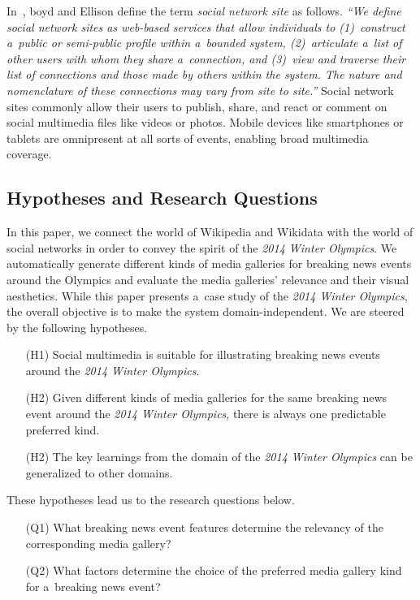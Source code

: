 \documentclass{sig-alternate}
\begin{document}
In~\cite{boyd2007socialnetworksites},
boyd and Ellison define the term
\emph{social network site} as follows.
\textit{``We define social network sites as web-based services
that allow individuals to
\emph{(1)}~construct a~public or
semi-public profile within a~bounded system,
\emph{(2)}~articulate a~list of other users
with whom they share a~connection, and
\emph{(3)}~view and traverse their list of connections
and those made by others within the system.
The nature and nomenclature of these connections
may vary from site to site.''}
Social network sites commonly allow their users
to publish, share, and react or comment on social multimedia files
like videos or photos.
Mobile devices like smartphones or tablets
are omnipresent at all sorts of events,
enabling broad multimedia coverage.

\subsection{Hypotheses and Research Questions}

In this paper, we connect the world of
Wikipedia and Wikidata with the world of social networks
in order to convey the spirit of the
\emph{2014 Winter Olympics}.
We automatically generate different kinds of media galleries
for breaking news events around the Olympics
and evaluate the media galleries' relevance
and their visual aesthetics.
While this paper presents a~case study
of the \emph{2014 Winter Olympics},
the overall objective is to make the system domain-inde\-pendent.
We are steered by the following hypotheses.

\begin{itemize}
  \itemsep0em
  \item[(H1)] Social multimedia is suitable for illustrating
    breaking news events around the \emph{2014 Winter Olympics}.
  \item[(H2)] Given different kinds of media galleries
    for the same breaking news event
    around the \emph{2014 Winter Olympics},
    there is always one predictable preferred kind.
  \item[(H2)] The key learnings from the domain of the
    \emph{2014 Winter Olympics} can be generalized
    to other domains.    
\end{itemize}

\noindent These hypotheses lead us to the research questions below.

\begin{itemize}
  \itemsep0em
  \item[(Q1)] What breaking news event features
    determine the relevancy of the corresponding media gallery?
  \item[(Q2)] What factors determine the choice
    of the preferred media gallery kind for a~breaking news event?
\end{itemize}
\end{document}
